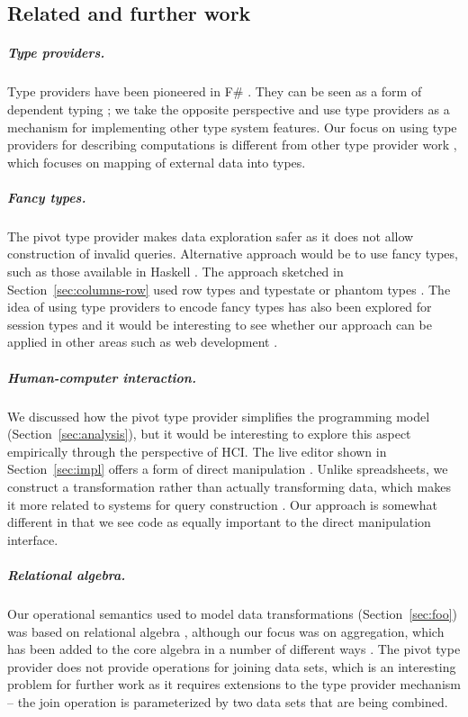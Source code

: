 \documentclass[a4paper,UKenglish]{lipics-v2016}
\theoremstyle{plain}
\theoremstyle{definition}
\begin{document}
\subsection{Related and further work}
\label{sec:further}

\subparagraph{Type providers.}
Type providers have been pioneered in F\# \cite{inforich}. They can be seen as a form of dependent 
typing \cite{idris-tp}; we take the opposite perspective and use type providers as a mechanism for 
implementing other type system features. Our focus on using type providers for describing 
computations is different from other type provider work \cite{fsdata,liteq,ageweb}, which focuses 
on mapping of external data into types.

\subparagraph{Fancy types.}
The pivot type provider makes data exploration safer as it does not allow construction of invalid
queries. Alternative approach would be to use fancy types, such as those available in Haskell \cite{frames,fancytypes}. 
The approach sketched in Section~\ref{sec:columns-row} used row types and typestate or phantom types 
\cite{rowtypes,typestate,phanty}. The idea of using type providers to encode fancy types has also been
explored for session types \cite{sessionty,sessiontp} and it would be interesting to see whether
our approach can be applied in other areas such as web development \cite{urweb}.

\subparagraph{Human-computer interaction.}
We discussed how the pivot type provider simplifies the programming model (Section~\ref{sec:analysis}),
but it would be interesting to explore this aspect empirically through the perspective of HCI. 
The live editor shown in Section~\ref{sec:impl} offers a form of direct manipulation 
\cite{directman,directman2,dynamicq}. Unlike spreadsheets, we construct a transformation rather than
actually transforming data, which makes it more related to systems for query construction
\cite{spreadsheetalgebra,querydirect}. Our approach is somewhat different in that we see code 
as equally important to the direct manipulation interface.

\subparagraph{Relational algebra.}
Our operational semantics used to model data transformations (Section~\ref{sec:foo}) was based on 
relational algebra \cite{relalg,dbsys}, although our focus was on aggregation, which has been 
added to the core algebra in a number of different ways \cite{sumtables,datacube,relalg-alpha,relalg-sparql}.
The pivot type provider does not provide operations for joining data sets, which is an interesting
problem for further work as it requires extensions to the type provider mechanism -- the join
operation is parameterized by two data sets that are being combined.
\end{document}
